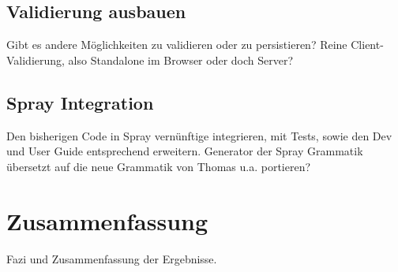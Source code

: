 \subsection{Validierung ausbauen}

Gibt es andere Möglichkeiten zu validieren oder zu persistieren?
Reine Client-Validierung, also Standalone im Browser oder doch Server?

\subsection{Spray Integration}

Den bisherigen Code in Spray vernünftige integrieren, mit Tests, sowie
den Dev und User Guide entsprechend erweitern.
Generator der Spray Grammatik übersetzt auf die neue Grammatik von Thomas u.a.
portieren?


\section{Zusammenfassung}

Fazi und Zusammenfassung der Ergebnisse.
